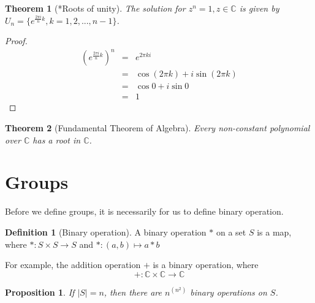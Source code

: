 \documentclass{article}
\theoremstyle{MyNonumberplain}
\theoremstyle{break}
\newtheorem*{proof}{Proof. }
\newcommand{\C}{\mathbb{C}}
\theoremstyle{break}
\newtheorem{theorem}{Theorem}[section]
\newtheorem{proposition}{Proposition}[section]
\theoremstyle{break}
\theoremstyle{definition}
\theoremstyle{break}
\newtheorem{definition}{Definition}[section]
\begin{document}
\begin{thmbox}
    \begin{theorem}[*Roots of unity]
        The solution for $z^n=1,z\in\C$ is given by $U_n=\{e^{\frac{2\pi i}{n}k}, k=1,2,...,n-1\}$.
    \end{theorem}
    \begin{prfbox}
        \begin{proof}
            \begin{eqnarray}
                \left( e^{\frac{2 \pi i}{n} k} \right)^n & = & e^{2 \pi k i}\nonumber\\
                & = & \cos (2 \pi k) + i \sin (2 \pi k)\nonumber\\
                & = & \cos 0 + i \sin 0\nonumber\\
                & = & 1 \nonumber
            \end{eqnarray}
        \end{proof}
    \end{prfbox}    
\end{thmbox}


\begin{thmbox}
    \begin{theorem}[Fundamental Theorem of Algebra]
        Every non-constant polynomial over $\mathbb{C}$ has a root in $\mathbb{C}$.
    \end{theorem}
\end{thmbox}


\newpage

\setcounter{section}{3}

\section{Groups}

Before we define groups, it is necessarily for us to define binary operation.

\begin{defbox}
    \begin{definition}[Binary operation]
        A binary operation $\ast$ on a set $S$ is a map, where $\ast : S \times S \rightarrow S$ and $\ast : (a, b) \mapsto a \ast b$
    \end{definition}
\end{defbox}

For example, the addition operation $+$ is a binary operation, where $$+:\C\times\C\to\C$$

\begin{thmbox}
    \begin{proposition}
        If $|S|=n$, then there are $n^{(n^2)}$ binary operations on $S$.
    \end{proposition}
\end{thmbox}
\end{document}
